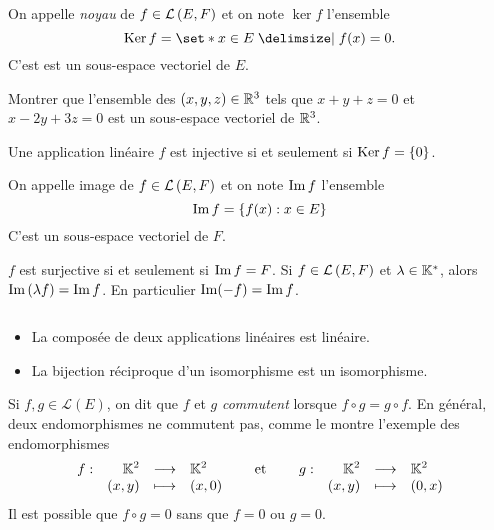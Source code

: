 \documentclass{magnolia}
\begin{document}
\begin{definition}[utile=-3]
On appelle \emph{noyau} de $f\in\mathcal{L}\left(E,F\right)$ et on note $\ker f$ l'ensemble
\[\ker f=\enstq{x\in E}{f(x)=0}.\]  
C'est est un sous-espace vectoriel de $E$.
\end{definition}



\begin{exoUnique}
\exo Montrer que l'ensemble des $(x,y,z)\in\mathbb{R}^3$ tels que
  $x+y+z=0$ et $x-2y+3z=0$ est un sous-espace vectoriel de $\mathbb{R}^3$.
\end{exoUnique}

\begin{proposition}[utile=3]
Une application linéaire $f$ est injective si et seulement si
\mbox{$\mathop{\rm Ker} f=\left\{0\right\}$}.
\end{proposition}

\begin{definition}[utile=-3]
On appelle image de $f\in\mathcal{L}\left(E,F\right)$ et on note $\operatorname{Im} f$ l'ensemble
\[\operatorname{Im} f=\left\{f(x) : x\in E\right\}\]
C'est un sous-espace vectoriel de $F$.
\end{definition}

\begin{remarques}
\remarque[utile=-3] $f$ est surjective si et seulement si $\operatorname{Im} f=F$.
\remarque[utile=1] Si $f\in\mathcal{L}\left(E,F\right)$ et $\lambda\in\mathbb{K}^*$, alors $\operatorname{Im}\left(\lambda f\right)=\operatorname{Im} f$. En particulier
  $\operatorname{Im}(-f)=\operatorname{Im} f$.
\end{remarques}


\begin{proposition}[utile=-3]
$\quad$
\begin{itemize}
\item La composée de deux applications linéaires est linéaire.
\item La bijection réciproque d'un isomorphisme est un isomorphisme.
\end{itemize}
\end{proposition}

\begin{remarques}
\remarque Si $f,g\in\mathcal{L}(E)$, on dit que $f$ et $g$ \emph{commutent} lorsque $f\circ g=g\circ f$.
  En général, deux endomorphismes ne commutent pas, comme le montre l'exemple des endomorphismes
  \[\begin{array}[t]{lrcl} \displaystyle{f} : & \displaystyle{\ensuremath{\mathbb{K}}^2} & \longrightarrow & \displaystyle{\ensuremath{\mathbb{K}}^2} \\ & \displaystyle{(x,y)} & \longmapsto & \displaystyle{(x, 0)} \end{array} \quad\quad\!\text{et}\quad\!\quad
    \begin{array}[t]{lrcl} \displaystyle{g} : & \displaystyle{\ensuremath{\mathbb{K}}^2} & \longrightarrow & \displaystyle{\ensuremath{\mathbb{K}}^2} \\ & \displaystyle{(x,y)} & \longmapsto & \displaystyle{(0,x)} \end{array}\]
\remarque Il est possible que $f\circ g=0$ sans que $f=0$ ou $g=0$.
\end{remarques}
\end{document}
